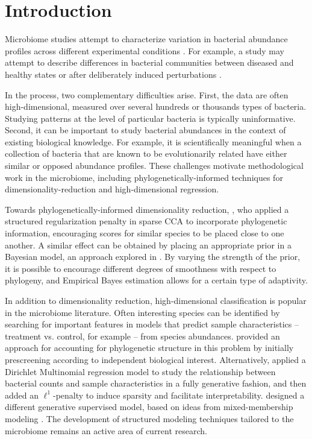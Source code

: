 \documentclass[oupdraft]{bio}
\begin{document}
\section{Introduction}

Microbiome studies attempt to characterize variation in bacterial abundance
profiles across different experimental conditions \citep{gilbert2014earth}. For
example, a study may attempt to describe differences in bacterial communities
between diseased and healthy states or after deliberately induced perturbations
\citep{dethlefsen2011incomplete, fukuyama2017multidomain}.

In the process, two complementary difficulties arise. First, the data are often
high-dimensional, measured over several hundreds or thousands types of bacteria.
Studying patterns at the level of particular bacteria is typically
uninformative. Second, it can be important to study bacterial abundances in the
context of existing biological knowledge. For example, it is scientifically
meaningful when a collection of bacteria that are known to be evolutionarily
related have either similar or opposed abundance profiles. These challenges
motivate methodological work in the microbiome, including
phylogenetically-informed techniques for dimensionality-reduction and
high-dimensional regression.

Towards phylogenetically-informed dimensionality reduction,
\cite{chen2013structure}, who applied a structured regularization penalty in
sparse CCA to incorporate phylogenetic information, encouraging scores for
similar species to be placed close to one another. A similar effect can be
obtained by placing an appropriate prior in a Bayesian model, an approach
explored in \cite{fukuyama2017adaptive}. By varying the strength of the prior,
it is possible to encourage different degrees of smoothness with respect to
phylogeny, and Empirical Bayes estimation allows for a certain type of
adaptivity.

In addition to dimensionality reduction, high-dimensional classification is
popular in the microbiome literature. Often interesting species can be
identified by searching for important features in models that predict sample
characteristics -- treatment vs. control, for example -- from species
abundances. \cite{segata2011metagenomic} provided an approach for accounting for
phylogenetic structure in this problem by initially prescreening according to
independent biological interest. Alternatively, \cite{chen2013variable} applied
a Dirichlet Multinomial regression model to study the relationship between
bacterial counts and sample characteristics in a fully generative fashion, and
then added an $\ell^{1}$-penalty to induce sparsity and facilitate
interpretability. \cite{shafiei2015biomico} designed a different generative
supervised model, based on ideas from mixed-membership modeling
\citep{blei2003latent}. The development of structured modeling techniques
tailored to the microbiome remains an active area of current research.
\end{document}
